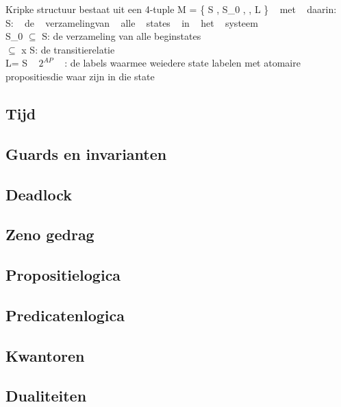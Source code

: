 \documentclass{article}
\begin{document}
 
 
 

 
 Kripke structuur
    bestaat uit  een 4-tuple M = \{ S ,  S_{0}  , \Re , L \} ~ met ~  daarin: \\
  S:  ~ de  ~ verzamelingvan ~  alle ~  states ~  in  ~ het ~  systeem \\
  S_{0} $\subseteq$ S: de verzameling van alle beginstates \\
  \Re $\subseteq$  x S: de transitierelatie \\
      L= S \to   ~ $2^{AP}$ ~ : de labels waarmee weiedere state labelen met atomaire propositiesdie waar zijn in die state\\

	\subsection{Tijd}
	
	\subsection{Guards en invarianten}
	
	\subsection{Deadlock}
	
	\subsection{Zeno gedrag}
	
 
	
	\subsection{Propositielogica}
	
	\subsection{Predicatenlogica}
	
	\subsection{Kwantoren}
	
	\subsection{Dualiteiten}
	
\end{document}
